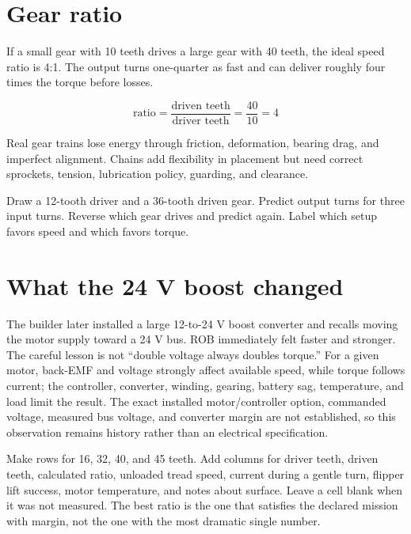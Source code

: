 \documentclass[11pt,openany]{book}
\begin{document}
\section*{Gear ratio}

If a small gear with 10 teeth drives a large gear with 40 teeth, the ideal speed ratio is 4:1. The output turns one-quarter as fast and can deliver roughly four times the torque before losses.

\[
\text{ratio} = \frac{\text{driven teeth}}{\text{driver teeth}} = \frac{40}{10}=4
\]

Real gear trains lose energy through friction, deformation, bearing drag, and imperfect alignment. Chains add flexibility in placement but need correct sprockets, tension, lubrication policy, guarding, and clearance.


\begin{buildbox}[title={GEAR CARD LAB}]
Draw a 12-tooth driver and a 36-tooth driven gear. Predict output turns for three input turns. Reverse which gear drives and predict again. Label which setup favors speed and which favors torque.
\end{buildbox}

\section*{What the 24 V boost changed}

The builder later installed a large 12-to-24 V boost converter and recalls moving the motor supply toward a 24 V bus. ROB immediately felt faster and stronger. The careful lesson is not ``double voltage always doubles torque.'' For a given motor, back-EMF and voltage strongly affect available speed, while torque follows current; the controller, converter, winding, gearing, battery sag, temperature, and load limit the result. The exact installed motor/controller option, commanded voltage, measured bus voltage, and converter margin are not established, so this observation remains history rather than an electrical specification.

\begin{missionbox}[title={BUILD A GEAR-RATIO TEST MATRIX}]
Make rows for 16, 32, 40, and 45 teeth. Add columns for driver teeth, driven teeth, calculated ratio, unloaded tread speed, current during a gentle turn, flipper lift success, motor temperature, and notes about surface. Leave a cell blank when it was not measured. The best ratio is the one that satisfies the declared mission with margin, not the one with the most dramatic single number.
\end{missionbox}
\end{document}
